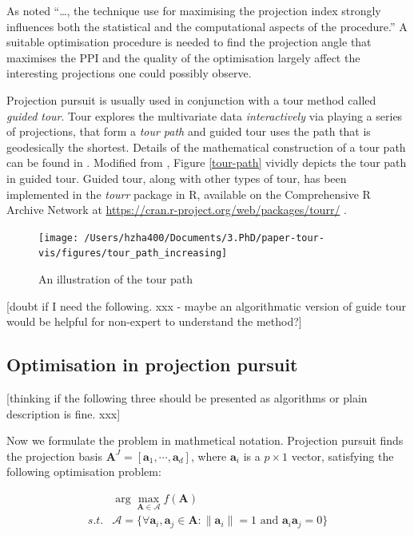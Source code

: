 \documentclass[12pt]{article}
\begin{document}
As \citet{friedman1974projection} noted ``\ldots{}, the technique use
for maximising the projection index strongly influences both the
statistical and the computational aspects of the procedure.'' A suitable
optimisation procedure is needed to find the projection angle that
maximises the PPI and the quality of the optimisation largely affect the
interesting projections one could possibly observe.

Projection pursuit is usually used in conjunction with a tour method
called \emph{guided tour}. Tour explores the multivariate data
\emph{interactively} via playing a series of projections, that form a
\emph{tour path} and guided tour uses the path that is geodesically the
shortest. Details of the mathematical construction of a tour path can be
found in \citet{buja2005computational}. Modified from
\citet{buja2005computational}, Figure \ref{tour-path} vividly depicts
the tour path in guided tour. Guided tour, along with other types of
tour, has been implemented in the \emph{tourr} package in R, available
on the Comprehensive R Archive Network at
\url{https://cran.r-project.org/web/packages/tourr/}
\citep{wickham2011tourrpackage}.

\begin{figure}
\texttt{[image: /Users/hzha400/Documents/3.PhD/paper-tour-vis/figures/tour\_path\_increasing]} \caption{\label{tour-path}An illustration of the tour path}\label{fig:tour-path}
\end{figure}

{[}doubt if I need the following. xxx - maybe an algorithmatic version
of guide tour would be helpful for non-expert to understand the
method?{]}

\hypertarget{optimisation-in-projection-pursuit}{%
\subsection{Optimisation in projection
pursuit}\label{optimisation-in-projection-pursuit}}

{[}thinking if the following three should be presented as algorithms or
plain description is fine. xxx{]}

Now we formulate the problem in mathmetical notation. Projection pursuit
finds the projection basis
\(\mathbf{A}^J = [\mathbf{a}_1, \cdots, \mathbf{a}_d]\), where
\(\mathbf{a}_i\) is a \(p \times 1\) vector, satisfying the following
optimisation problem:

\begin{align}
&\arg \max_{\mathbf{A} \in \mathcal{A}} f(\mathbf{A}) \\
s.t. & \mathcal{A} = \{ \forall \mathbf{a}_i, \mathbf{a}_j \in \mathbf{A}: \lVert \mathbf{a}_i \rVert = 1 \text{ and } \mathbf{a}_i \mathbf{a}_j = 0 \}
\end{align}
\end{document}
